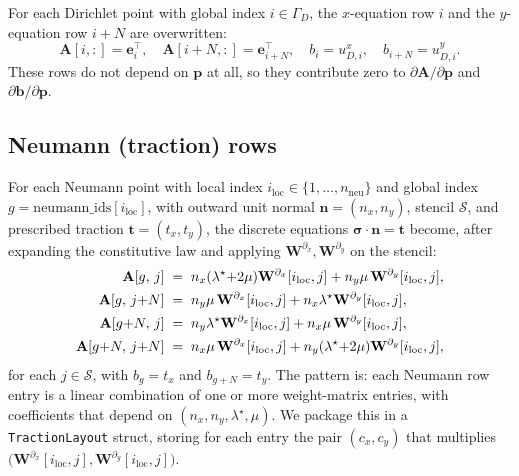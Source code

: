 \documentclass[11pt,a4paper]{article}
\newcommand{\mat}[1]{\mathbf{#1}}
\newcommand{\vect}[1]{\boldsymbol{#1}}
\newcommand{\pts}{\vect{p}}
\begin{document}
For each Dirichlet point with global index $i \in \Gamma_D$, the
$x$-equation row $i$ and the $y$-equation row $i+N$ are overwritten:
\begin{equation}
  \mat A[i,:] = \vect e_i^\top, \quad
  \mat A[i{+}N,:] = \vect e_{i+N}^\top, \quad
  b_i = u_{D,i}^x,\quad b_{i+N} = u_{D,i}^y.
  \label{eq:dirichlet}
\end{equation}
These rows do not depend on $\pts$ at all, so they contribute zero
to $\partial\mat A/\partial\pts$ and $\partial\vect b/\partial\pts$.

\subsection{Neumann (traction) rows}
\label{sec:neumann-row}

For each Neumann point with local index
$i_{\text{loc}} \in \{1,\ldots,n_{\text{neu}}\}$ and global index
$g = \text{neumann\_ids}[i_{\text{loc}}]$, with outward unit normal
$\vect n = (n_x, n_y)$, stencil $\mathcal S$, and prescribed traction
$\vect t = (t_x, t_y)$, the discrete equations
$\vect\sigma\!\cdot\!\vect n = \vect t$ become, after expanding the
constitutive law and applying $\mat W^{\partial_x},
\mat W^{\partial_y}$ on the stencil:
\begin{align}
  \mat A[g,\,j]
    \;&=\; n_x(\lambda^\star{+}2\mu) \mat W^{\partial_x}[i_{\text{loc}},j]
        + n_y\mu\, \mat W^{\partial_y}[i_{\text{loc}},j], \notag\\
  \mat A[g,\,j{+}N]
    \;&=\; n_y\mu\, \mat W^{\partial_x}[i_{\text{loc}},j]
        + n_x \lambda^\star \mat W^{\partial_y}[i_{\text{loc}},j], \notag\\
  \mat A[g{+}N,\,j]
    \;&=\; n_y \lambda^\star \mat W^{\partial_x}[i_{\text{loc}},j]
        + n_x\mu\, \mat W^{\partial_y}[i_{\text{loc}},j], \notag\\
  \mat A[g{+}N,\,j{+}N]
    \;&=\; n_x\mu\, \mat W^{\partial_x}[i_{\text{loc}},j]
        + n_y(\lambda^\star{+}2\mu) \mat W^{\partial_y}[i_{\text{loc}},j],
  \label{eq:neumann-row}
\end{align}
for each $j \in \mathcal S$, with
$b_g = t_x$ and $b_{g+N} = t_y$. The pattern is: each Neumann row
entry is a linear combination of one or more weight-matrix entries,
with coefficients that depend on $(n_x, n_y, \lambda^\star, \mu)$.
We package this in a \texttt{TractionLayout} struct, storing for
each entry the pair $(c_x, c_y)$ that multiplies
$\big(\mat W^{\partial_x}[i_{\text{loc}}, j],
\mat W^{\partial_y}[i_{\text{loc}}, j]\big)$.
\end{document}
